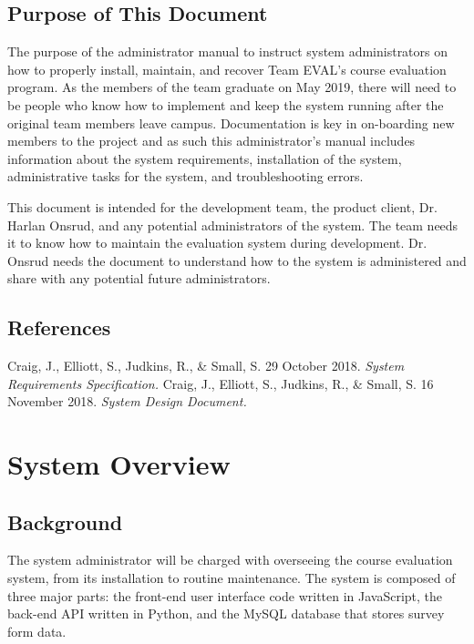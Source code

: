 \documentclass{article}
\begin{document}
\subsection{Purpose of This Document}

The purpose of the administrator manual to instruct system administrators on how to properly install, maintain, and recover Team EVAL's course evaluation program. As the members of the team graduate on May 2019, there will need to be people who know how to implement and keep the system running after the original team members leave campus.  Documentation is key in on-boarding new members to the project and as such this administrator's manual includes information about the system requirements, installation of the system, administrative tasks for the system, and troubleshooting errors.

This document is intended for the development team, the product client, Dr. Harlan Onsrud, and any potential administrators of the system. The team needs it to know how to maintain the evaluation system during development. Dr. Onsrud needs the document to understand how to the system is administered and share with any potential future administrators.

\subsection{References}

Craig, J., Elliott, S., Judkins, R., \& Small, S. 29 October 2018. \textit{System Requirements Specification.}
\vspace{3mm}\newline
Craig, J., Elliott, S., Judkins, R., \& Small, S. 16 November 2018. \textit{System Design Document.}

\section{System Overview}

\subsection{Background}

The system administrator will be charged with overseeing the course evaluation system, from its installation to routine maintenance. The system is composed of three major parts: the front-end user interface code written in JavaScript, the back-end API written in Python, and the MySQL database that stores survey form data. 
\end{document}
